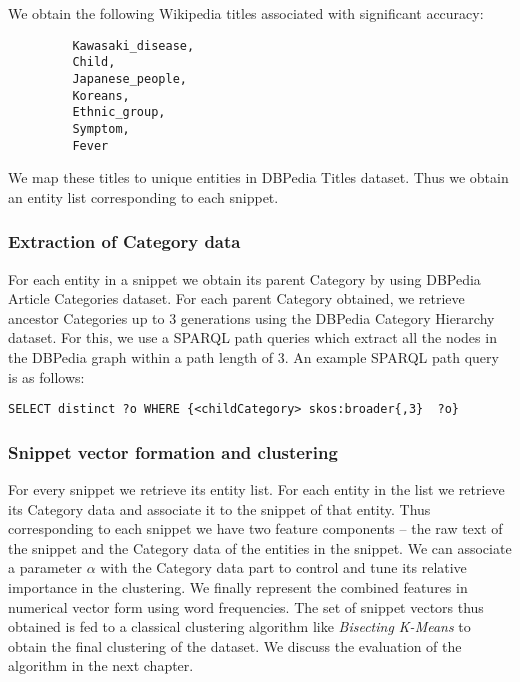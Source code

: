 \documentclass[a4paper,12pt]{report}
\begin{document}
We obtain the following Wikipedia titles associated with significant
accuracy:
\begin{verbatim}
         Kawasaki_disease,
         Child,
         Japanese_people,
         Koreans,
         Ethnic_group,
         Symptom,
         Fever
\end{verbatim}
 We map these titles to unique entities in
DBPedia Titles dataset. Thus we obtain an entity list corresponding to
each snippet.


\subsubsection{Extraction of Category data}
For each entity in a snippet we obtain its parent Category by using
DBPedia Article Categories dataset. For each parent Category obtained,
we retrieve ancestor Categories up to 3 generations using the DBPedia
Category Hierarchy dataset. For this, we use a SPARQL path queries
which extract all the nodes in the DBPedia graph within a path length
of 3. An example SPARQL path query is as follows: 

\begin{verbatim}
SELECT distinct ?o WHERE {<childCategory> skos:broader{,3}  ?o}
\end{verbatim}

\subsubsection{Snippet vector formation and clustering}

For every snippet we retrieve its entity list. For each entity in the
list we retrieve its Category data and associate it to the snippet of
that entity. Thus corresponding to each snippet we have two feature
components -- the raw text of the snippet and the Category data of the
entities in the snippet. We can associate a parameter $\alpha$ with
the Category data part to control and tune its relative importance in
the clustering. We finally represent the combined features in
numerical vector form using word frequencies. The set of snippet
vectors thus obtained is fed to a classical clustering algorithm like
{\it Bisecting K-Means} to obtain the final clustering of the dataset. We
discuss the evaluation of the algorithm in the next chapter.
\end{document}

